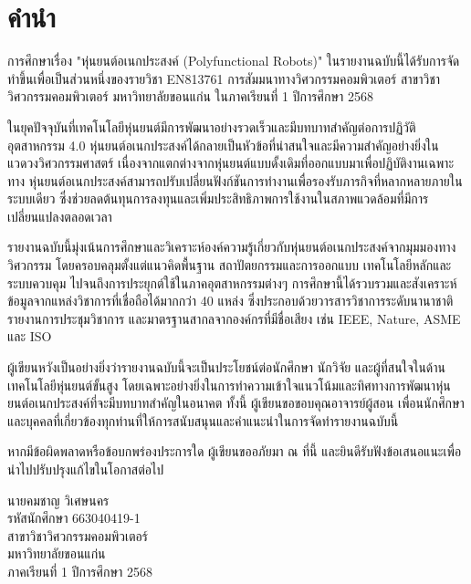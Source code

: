 \documentclass[a4paper]{article}
\begin{document}
\setcounter{page}{1}

\section*{คำนำ}
การศึกษาเรื่อง "หุ่นยนต์อเนกประสงค์ (Polyfunctional Robots)" ในรายงานฉบับนี้ได้รับการจัดทำขึ้นเพื่อเป็นส่วนหนึ่งของรายวิชา EN813761 การสัมมนาทางวิศวกรรมคอมพิวเตอร์ สาขาวิชาวิศวกรรมคอมพิวเตอร์ มหาวิทยาลัยขอนแก่น ในภาคเรียนที่ 1 ปีการศึกษา 2568

ในยุคปัจจุบันที่เทคโนโลยีหุ่นยนต์มีการพัฒนาอย่างรวดเร็วและมีบทบาทสำคัญต่อการปฏิวัติอุตสาหกรรม 4.0 หุ่นยนต์อเนกประสงค์ได้กลายเป็นหัวข้อที่น่าสนใจและมีความสำคัญอย่างยิ่งในแวดวงวิศวกรรมศาสตร์ เนื่องจากแตกต่างจากหุ่นยนต์แบบดั้งเดิมที่ออกแบบมาเพื่อปฏิบัติงานเฉพาะทาง หุ่นยนต์อเนกประสงค์สามารถปรับเปลี่ยนฟังก์ชันการทำงานเพื่อรองรับภารกิจที่หลากหลายภายในระบบเดียว ซึ่งช่วยลดต้นทุนการลงทุนและเพิ่มประสิทธิภาพการใช้งานในสภาพแวดล้อมที่มีการเปลี่ยนแปลงตลอดเวลา

รายงานฉบับนี้มุ่งเน้นการศึกษาและวิเคราะห์องค์ความรู้เกี่ยวกับหุ่นยนต์อเนกประสงค์จากมุมมองทางวิศวกรรม โดยครอบคลุมตั้งแต่แนวคิดพื้นฐาน สถาปัตยกรรมและการออกแบบ เทคโนโลยีหลักและระบบควบคุม ไปจนถึงการประยุกต์ใช้ในภาคอุตสาหกรรมต่างๆ การศึกษานี้ได้รวบรวมและสังเคราะห์ข้อมูลจากแหล่งวิชาการที่เชื่อถือได้มากกว่า 40 แหล่ง ซึ่งประกอบด้วยวารสารวิชาการระดับนานาชาติ รายงานการประชุมวิชาการ และมาตรฐานสากลจากองค์กรที่มีชื่อเสียง เช่น IEEE, Nature, ASME และ ISO

ผู้เขียนหวังเป็นอย่างยิ่งว่ารายงานฉบับนี้จะเป็นประโยชน์ต่อนักศึกษา นักวิจัย และผู้ที่สนใจในด้านเทคโนโลยีหุ่นยนต์ขั้นสูง โดยเฉพาะอย่างยิ่งในการทำความเข้าใจแนวโน้มและทิศทางการพัฒนาหุ่นยนต์อเนกประสงค์ที่จะมีบทบาทสำคัญในอนาคต ทั้งนี้ ผู้เขียนขอขอบคุณอาจารย์ผู้สอน เพื่อนนักศึกษา และบุคคลที่เกี่ยวข้องทุกท่านที่ให้การสนับสนุนและคำแนะนำในการจัดทำรายงานฉบับนี้

หากมีข้อผิดพลาดหรือข้อบกพร่องประการใด ผู้เขียนขออภัยมา ณ ที่นี้ และยินดีรับฟังข้อเสนอแนะเพื่อนำไปปรับปรุงแก้ไขในโอกาสต่อไป

\vspace{1em}

\begin{flushright}
นายคมชาญ วิเศษนคร\\
รหัสนักศึกษา 663040419-1\\
สาขาวิชาวิศวกรรมคอมพิวเตอร์\\
มหาวิทยาลัยขอนแก่น\\
ภาคเรียนที่ 1 ปีการศึกษา 2568
\end{flushright}
\end{document}
